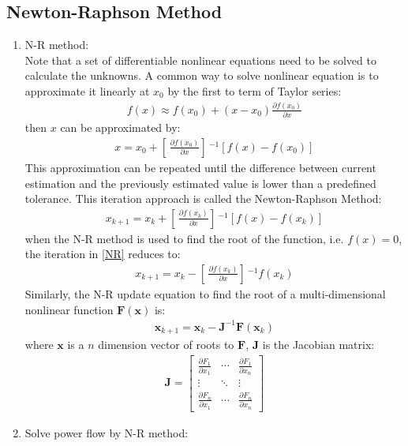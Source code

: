 \documentclass[journal,12pt,onecolumn,draftclsnofoot]{IEEEtran}
\newcommand{\x}{\boldsymbol{x}}
\newcommand{\J}{\boldsymbol{J}}
\newcommand{\F}{\boldsymbol{F}}
\theoremstyle{definition}
\begin{document}
\subsection{Newton-Raphson Method}
\begin{enumerate}
\item N-R method:\\
Note that a set of differentiable nonlinear equations need to be solved to calculate the unknowns. A common way to solve nonlinear equation is to approximate it linearly at $x_0$ by the first to term of Taylor series:
\begin{align}
f(x) \approx f(x_0) + (x-x_0)\frac{\partial f(x_0)}{\partial x}
\end{align}
then $x$ can be approximated by:
\begin{align}
\label{NR}
x = x_0 + [ \, \frac{\partial f(x_0)}{\partial x} ] \,^{-1}[f(x)-f(x_0)]
\end{align}
This approximation can be repeated until the difference between current estimation and the previously estimated value is lower than a predefined tolerance. This iteration approach is called the Newton-Raphson Method:
\begin{align}
x_{k+1} = x_k + [ \,\frac{\partial f(x_k)}{\partial x}] \,^{-1}[f(x)-f(x_k)]
\end{align}
when the N-R method is used to find the root of the function, i.e. $f(x)=0$, the iteration in \eqref{NR} reduces to:
\begin{align}
x_{k+1} = x_k - [ \,\frac{\partial f(x_k)}{\partial x}] \,^{-1}f(x_k)
\end{align}
Similarly, the N-R update equation to find the root of a multi-dimensional nonlinear function $\F(\x)$ is:
\begin{align}
\label{MNR}
\x_{k+1} = \x_k -\J^{-1}\F(\x_k)
\end{align}
where $\x$ is a $n$ dimension vector of roots to $\F$, $\J$ is the Jacobian matrix:
\begin{align*}
\J = 
\begin{bmatrix}
\frac{\partial F_1}{\partial x_1} & \cdots & \frac{\partial F_1}{\partial x_n} \\
\vdots & \ddots & \vdots \\
\frac{\partial F_n}{\partial x_1} & \cdots & \frac{\partial F_n}{\partial x_n}
\end{bmatrix}
\end{align*}
\item Solve power flow by N-R method:\\

\end{enumerate}
\end{document}
